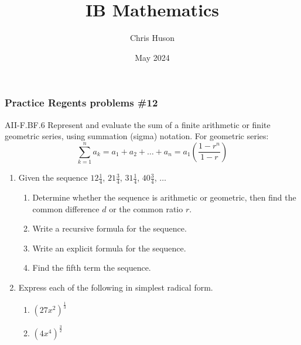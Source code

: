 \documentclass[12pt, twoside]{article}
\title{IB Mathematics}
\author{Chris Huson}
\date{May 2024}
\begin{document}
\subsubsection*{Practice Regents problems \#12}
AII-F.BF.6 Represent and evaluate the sum of a finite arithmetic
or finite geometric series, using summation (sigma) notation. For geometric series:
$$\sum_{k=1}^{n} a_k = a_1 + a_2 + \ldots + a_n = a_1 \left( \frac{1-r^n}{1-r} \right)$$

\begin{enumerate}
\item Given the sequence $12 \frac{1}{4}$, $21 \frac{3}{4}$, $31 \frac{1}{4}$, $40 \frac{3}{4}$, $\ldots$
\begin{enumerate}[itemsep=2cm]
    \item Determine whether the sequence is arithmetic or geometric, then find the common difference $d$ or the common ratio $r$.
    \item Write a recursive formula for the sequence.
    \item Write an explicit formula for the sequence.
    \item Find the fifth term the sequence.
\end{enumerate} \vspace{3cm}

\item Express each of the following in simplest radical form. 
\begin{multicols}{2}
    \begin{enumerate}
        \item $(27x^2)^{\frac{1}{3}}$
        \item $(4x^4)^{\frac{3}{2}}$
    \end{enumerate}
\end{multicols}
\vspace{3cm}


\end{enumerate}
\end{document}
